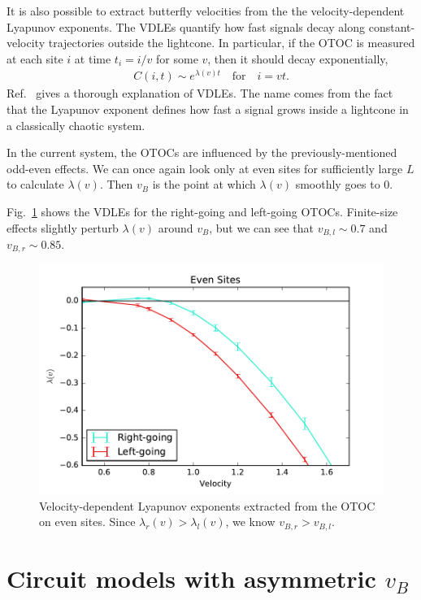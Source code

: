 \documentclass[aps,prl,reprint,superscriptaddress, longbibliography]{revtex4-1}
\begin{document}
It is also possible to extract butterfly velocities from the the velocity-dependent Lyapunov exponents. The VDLEs quantify how fast signals decay along constant-velocity trajectories outside the lightcone. In particular, if the OTOC is measured at each site $i$ at time $t_i = i/v$ for some $v$, then it should decay exponentially,
\begin{align}
	C(i, t) \sim e^{\lambda(v)t}\quad\text{for}\quad i = vt.
\end{align}
Ref.~\cite{khemani2018lambda} gives a thorough explanation of VDLEs. The name comes from the fact that the Lyapunov exponent defines how fast a signal grows inside a lightcone in a classically chaotic system.

In the current system, the OTOCs are influenced by the previously-mentioned odd-even effects. We can once again look only at even sites for sufficiently large $L$ to calculate $\lambda(v)$. Then $v_B$ is the point at which $\lambda(v)$ smoothly goes to 0.

Fig.~\ref{fig:vdle} shows the VDLEs for the right-going and left-going OTOCs. Finite-size effects slightly perturb $\lambda(v)$ around $v_B$, but we can see that $v_{B,l} \sim 0.7$ and $v_{B,r} \sim 0.85$.

\begin{figure}
	\includegraphics[width=\columnwidth]{vdle}
	\caption{Velocity-dependent Lyapunov exponents extracted from the OTOC on even sites. Since $\lambda_r(v)>\lambda_l(v)$, we know $v_{B,r}>v_{B,l}$.}
	\label{fig:vdle}
\end{figure}

\section{Circuit models with asymmetric $v_B$} \label{sec:circ}
\end{document}
